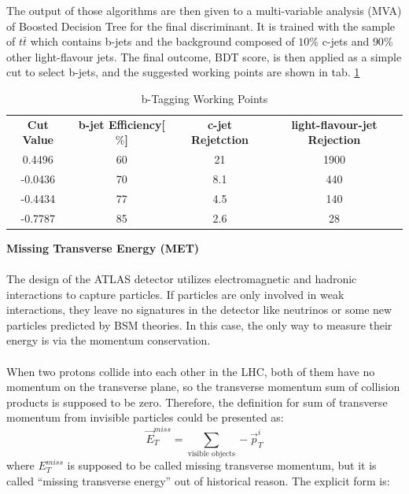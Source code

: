 \noindent
The output of those algorithms are then given to a multi-variable analysis (MVA) of Boosted Decision Tree for the final discriminant. It is trained with the sample of $t\bar{t}$ which contains b-jets and the background composed of $10\%$ c-jets and $90\%$ other light-flavour jets. The final outcome, BDT score, is then applied as a simple cut to select b-jets, and the suggested working points are shown in tab. \ref{Tab:b-tag}

\begin{table}[h]
	\caption{b-Tagging Working Points}
	\renewcommand{\arraystretch}{1.5}
	\centering
	\begin{adjustbox}{center}
		\begin{tabular}{|c | c | c | c |}
			\hline
			\hline
			{\bf Cut Value}    & {\bf b-jet Efficiency[$\%$]}  & {\bf c-jet Rejetction} & {\bf light-flavour-jet Rejection}\\
			0.4496 & 60 & 21 & 1900 \\
			-0.0436& 70 & 8.1& 440 \\
			-0.4434& 77 & 4.5&  140 \\
			-0.7787& 85 & 2.6&  28 \\
			\hline
		\end{tabular}
	\end{adjustbox}
	\label{Tab:b-tag}
\end{table}		
\noindent
{\bf Missing Transverse Energy (MET)}
\\
\\The design of the ATLAS detector utilizes electromagnetic and hadronic interactions to capture particles. If particles are only involved in weak interactions, they leave no signatures in the detector like neutrinos or some new particles predicted by BSM theories. In this case, the only way to measure their energy is via the momentum conservation. 
\\
\\When two protons collide into each other in the LHC, both of them have no momentum on the transverse plane, so the transverse momentum sum of collision products is supposed to be zero. Therefore, the definition for sum of transverse momentum from invisible particles could be presented as:
\begin{equation}
\vec{E}_{T}^{miss} = \sum_{\text{visible objects}} -\vec{p}_{T}^{i}
\end{equation}
where $E_{T}^{miss}$ is supposed to be called missing transverse momentum, but it is called ``missing transverse energy'' out of historical reason. The explicit form is:
